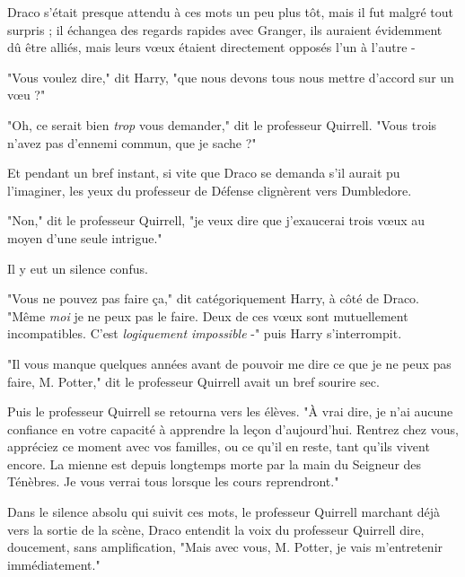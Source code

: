 Draco s'était presque attendu à ces mots un peu plus tôt, mais il fut malgré tout surpris ; il échangea des regards rapides avec Granger, ils auraient évidemment dû être alliés, mais leurs vœux étaient directement opposés l'un à l'autre -

"Vous voulez dire," dit Harry, "que nous devons tous nous mettre d'accord sur un vœu ?"

"Oh, ce serait bien \emph{trop}  vous demander," dit le professeur Quirrell. "Vous trois n'avez pas d'ennemi commun, que je sache ?"

Et pendant un bref instant, si vite que Draco se demanda s'il aurait pu l'imaginer, les yeux du professeur de Défense clignèrent vers Dumbledore.

"Non," dit le professeur Quirrell, "je veux dire que j'exaucerai trois vœux au moyen d'une seule intrigue."

Il y eut un silence confus.

"Vous ne pouvez pas faire ça," dit catégoriquement Harry, à côté de Draco. "Même \emph{moi}  je ne peux pas le faire. Deux de ces vœux sont mutuellement incompatibles. C'est \emph{logiquement impossible } -" puis Harry s'interrompit.

"Il vous manque quelques années avant de pouvoir me dire ce que je ne peux pas faire, M. Potter," dit le professeur Quirrell avait un bref sourire sec.

Puis le professeur Quirrell se retourna vers les élèves. "À vrai dire, je n'ai aucune confiance en votre capacité à apprendre la leçon d'aujourd'hui. Rentrez chez vous, appréciez ce moment avec vos familles, ou ce qu'il en reste, tant qu'ils vivent encore. La mienne est depuis longtemps morte par la main du Seigneur des Ténèbres. Je vous verrai tous lorsque les cours reprendront."

Dans le silence absolu qui suivit ces mots, le professeur Quirrell marchant déjà vers la sortie de la scène, Draco entendit la voix du professeur Quirrell dire, doucement, sans amplification, "Mais avec vous, M. Potter, je vais m'entretenir immédiatement."

